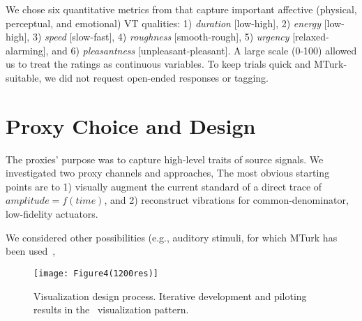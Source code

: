 We chose six quantitative metrics from \cite{Seifi2015} that capture important affective (physical, perceptual, and %
emotional) VT qualities:
 1) \textit{duration} [low-high], 
 2) \textit{energy} [low-high], 
 3) \textit{speed} [slow-fast], 
 4) \textit{roughness} [smooth-rough], 
 5) \textit{urgency} [relaxed-alarming], and 
 6) \textit{pleasantness} [unpleasant-pleasant].
A large scale (0-100) 
allowed us to treat the ratings as continuous variables.
To keep trials quick and MTurk-suitable,
we did not request open-ended responses or tagging. %

\section{Proxy Choice and Design}
The proxies' purpose was to capture high-level traits of source signals. 
We investigated two proxy channels and approaches,  %
The most obvious starting points are to 
1) visually augment the current standard of a direct trace of $amplitude=f(time)$, and
2) reconstruct vibrations for common-denominator, low-fidelity actuators.

We considered other possibilities (e.g., auditory stimuli, for which MTurk  has been used~\cite{Cartwright2015},   





    \begin{figure*}
        \centering
        \texttt{[image: Figure4(1200res)]}
        \caption{Visualization design process. Iterative development and piloting results in the \linear~visualization pattern.}
        \label{fig:vis:initialdesigns}
    \end{figure*}
    
